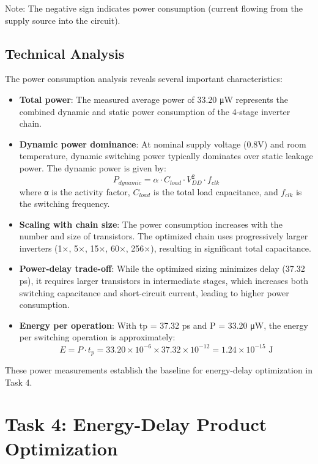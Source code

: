 \documentclass[UTF8,12pt,a4paper]{ctexart}
\begin{document}
Note: The negative sign indicates power consumption (current flowing from the supply source into the circuit).

\subsection{Technical Analysis}

The power consumption analysis reveals several important characteristics:

\begin{itemize}
    \item \textbf{Total power}: The measured average power of 33.20 μW represents the combined dynamic and static power consumption of the 4-stage inverter chain.
    
    \item \textbf{Dynamic power dominance}: At nominal supply voltage (0.8V) and room temperature, dynamic switching power typically dominates over static leakage power. The dynamic power is given by:
    \[P_{dynamic} = \alpha \cdot C_{load} \cdot V_{DD}^2 \cdot f_{clk}\]
    where α is the activity factor, $C_{load}$ is the total load capacitance, and $f_{clk}$ is the switching frequency.
    
    \item \textbf{Scaling with chain size}: The power consumption increases with the number and size of transistors. The optimized chain uses progressively larger inverters (1×, 5×, 15×, 60×, 256×), resulting in significant total capacitance.
    
    \item \textbf{Power-delay trade-off}: While the optimized sizing minimizes delay (37.32 ps), it requires larger transistors in intermediate stages, which increases both switching capacitance and short-circuit current, leading to higher power consumption.
    
    \item \textbf{Energy per operation}: With tp = 37.32 ps and P = 33.20 μW, the energy per switching operation is approximately:
    \[E = P \cdot t_p = 33.20 \times 10^{-6} \times 37.32 \times 10^{-12} = 1.24 \times 10^{-15} \text{ J}\]
\end{itemize}

These power measurements establish the baseline for energy-delay optimization in Task 4.

\section{Task 4: Energy-Delay Product Optimization}
\end{document}
